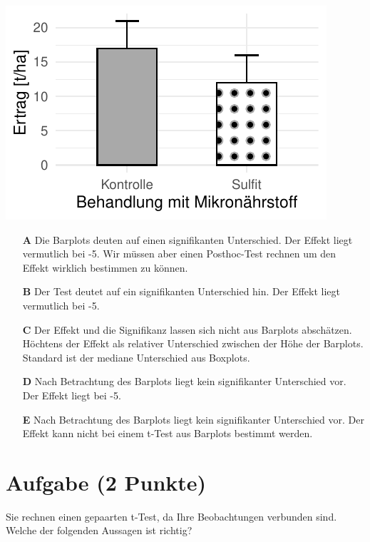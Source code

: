 \documentclass[a4paper, 9pt]{scrartcl}\usepackage[]{graphicx}\usepackage[]{xcolor}
\makeatletter
\def\maxwidth{ %
  \ifdim\Gin@nat@width>\linewidth
    \linewidth
  \else
    \Gin@nat@width
  \fi
}
\makeatother
\begin{document}
{\centering \includegraphics[width=\maxwidth]{img/mc-testing-ttest-02-1} 

}







\begin{enumerate}
\item [\textbf{A} \msquare] Die Barplots deuten auf einen signifikanten Unterschied. Der Effekt liegt vermutlich bei -5. Wir müssen aber einen Posthoc-Test rechnen um den Effekt wirklich bestimmen zu können.
\item [\textbf{B} \msquare] Der Test deutet auf ein signifikanten Unterschied hin. Der Effekt liegt vermutlich bei -5.
\item [\textbf{C} \msquare] Der Effekt und die Signifikanz lassen sich nicht aus Barplots abschätzen. Höchtens der Effekt als relativer Unterschied zwischen der Höhe der Barplots. Standard ist der mediane Unterschied aus Boxplots.
\item [\textbf{D} \msquare] Nach Betrachtung des Barplots liegt kein signifikanter Unterschied vor. Der Effekt liegt bei -5.
\item [\textbf{E} \msquare] Nach Betrachtung des Barplots liegt kein signifikanter Unterschied vor. Der Effekt kann nicht bei einem t-Test aus Barplots bestimmt werden.
\end{enumerate}

\section{Aufgabe \hfill (2 Punkte)}




Sie rechnen einen gepaarten t-Test, da Ihre Beobachtungen verbunden sind. Welche der folgenden Aussagen ist richtig?
\end{document}
